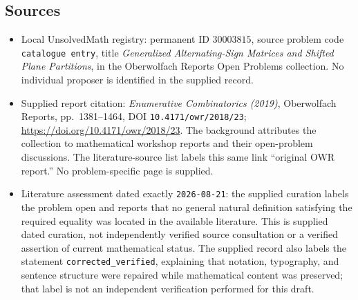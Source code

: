 \documentclass[11pt]{article}
\begin{document}
\subsection{Sources}
\begin{itemize}
\item Local UnsolvedMath registry: permanent ID \(30003815\), source problem code \texttt{catalogue entry}, title \emph{Generalized Alternating-Sign Matrices and Shifted Plane Partitions}, in the Oberwolfach Reports Open Problems collection. No individual proposer is identified in the supplied record.
\item Supplied report citation: \emph{Enumerative Combinatorics (2019)}, Oberwolfach Reports, pp.~1381--1464, DOI \texttt{10.4171/owr/2018/23}; \url{https://doi.org/10.4171/owr/2018/23}. The background attributes the collection to mathematical workshop reports and their open-problem discussions. The literature-source list labels this same link ``original OWR report.'' No problem-specific page is supplied.
\item Literature assessment dated exactly \texttt{2026-08-21}: the supplied curation labels the problem open and reports that no general natural definition satisfying the required equality was located in the available literature. This is supplied dated curation, not independently verified source consultation or a verified assertion of current mathematical status. The supplied record also labels the statement \texttt{corrected\_verified}, explaining that notation, typography, and sentence structure were repaired while mathematical content was preserved; that label is not an independent verification performed for this draft.
\end{itemize}
\end{document}
